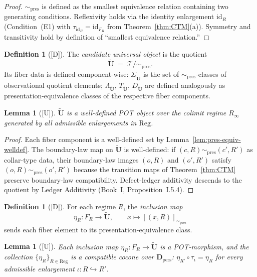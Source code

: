 \documentclass[12pt,oneside]{amsbook}
\theoremstyle{plain}
\newtheorem{lemma}[theorem]{Lemma}
\theoremstyle{definition}
\newtheorem{definition}[theorem]{Definition}
\theoremstyle{remark}
\newcommand{\status}[1]{\textup{[#1]}}
\begin{document}
\begin{proof}
$\sim_{\mathrm{pres}}$ is defined as the smallest equivalence relation
containing two generating conditions.  Reflexivity holds via the
identity enlargement $\mathrm{id}_R$ (Condition~(E1) with
$\tau_{\mathrm{id}_R} = \mathrm{id}_{F_R}$ from
Theorem~\ref{thm:CTM}(a)).  Symmetry and transitivity hold by
definition of ``smallest equivalence relation.''
\end{proof}

\begin{definition}[\status{D}]\label{def:candidate-U}
The \emph{candidate universal object} is the quotient
\[
  \widetilde{\mathbf{U}} \;=\; \mathcal{T}/{\sim_{\mathrm{pres}}}.
\]
Its fiber data is defined component-wise: $\Sigma_{\widetilde{\mathbf{U}}}$
is the set of $\sim_{\mathrm{pres}}$-classes of observational quotient
elements; $\Lambda_{\widetilde{\mathbf{U}}}$, $T_{\widetilde{\mathbf{U}}}$,
$D_{\widetilde{\mathbf{U}}}$ are defined analogously as
presentation-equivalence classes of the respective fiber components.
\end{definition}

\begin{lemma}[\status{U}]\label{lem:candidate-POT-object}
$\widetilde{\mathbf{U}}$ is a well-defined POT object over the colimit
regime $R_\infty$ generated by all admissible enlargements in
$\mathrm{Reg}$.
\end{lemma}

\begin{proof}
Each fiber component is a well-defined set by Lemma~\ref{lem:pres-equiv-welldef}.
The boundary-law map on $\widetilde{\mathbf{U}}$ is well-defined:
if $(c, R) \sim_{\mathrm{pres}} (c', R')$ as collar-type data, their
boundary-law images $(o, R)$ and $(o', R')$ satisfy $(o, R)
\sim_{\mathrm{pres}} (o', R')$ because the transition maps of
Theorem~\ref{thm:CTM} preserve boundary-law compatibility.  Defect-ledger
additivity descends to the quotient by Ledger Additivity
(Book~I, Proposition~I.5.4).
\end{proof}

\begin{definition}[\status{D}]\label{def:inclusion-maps}
For each regime $R$, the \emph{inclusion map}
\[
  \eta_R: F_R \to \widetilde{\mathbf{U}}, \qquad x \mapsto [(x,R)]_{\sim_{\mathrm{pres}}}
\]
sends each fiber element to its presentation-equivalence class.
\end{definition}

\begin{lemma}[\status{U}]\label{lem:inclusion-cocone}
Each inclusion map $\eta_R: F_R \to \widetilde{\mathbf{U}}$ is a
POT-morphism, and the collection $\{\eta_R\}_{R \in \mathrm{Reg}}$ is
a compatible cocone over $\mathbf{D}_{\mathrm{pers}}$: $\eta_{R'}
\circ \tau_\iota = \eta_R$ for every admissible enlargement $\iota:
R \hookrightarrow R'$.
\end{lemma}
\end{document}
